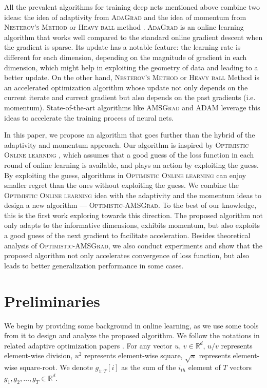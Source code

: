 \documentclass[11pt]{article}
\theoremstyle{k}
\begin{document}
All the prevalent algorithms for training deep nets mentioned above combine two ideas: the idea of adaptivity from \textsc{AdaGrad} \cite{DHS11,MS10} and the idea of momentum from \textsc{Nesterov's  Method} \cite{N04} or \textsc{Heavy ball} method \cite{P64}.
\textsc{AdaGrad} is an online learning algorithm that works well compared to the standard online gradient descent when the gradient is sparse.
Its update has a notable feature: the learning rate is different for each dimension, depending on the magnitude of gradient in each dimension, which might help in exploiting the geometry of data and leading to a better update. 
On the other hand,
\textsc{Nesterov's Method} or \textsc{Heavy ball} Method \cite{P64} is an accelerated optimization algorithm whose update not only depends on the current iterate and current gradient but also depends on the past gradients (i.e. momentum). State-of-the-art algorithms like \textsc{AMSGrad} \cite{RKK18} and \textsc{ADAM} \cite{KB15} leverage this ideas to accelerate the training process of neural nets.

In this paper, we propose an algorithm that goes further than the hybrid of the adaptivity and momentum approach. Our algorithm is inspired by \textsc{Optimistic Online learning} \cite{CJ12,RS13,SALS15,ALLW18}, which assumes that a good guess of the loss function in each round of online learning is available, and plays an action by exploiting the guess. 
By exploiting the guess, algorithms in 
\textsc{Optimistic Online learning}
can enjoy smaller regret than the ones without exploiting the guess.
We combine the \textsc{Optimistic Online learning} idea with the adaptivity and the momentum ideas to design a new algorithm --- \textsc{Optimistic-AMSGrad}. To the best of our knowledge, this is the first work exploring towards this direction. The proposed algorithm
not only adapts to the informative dimensions, exhibits momentum, but also exploits a good guess of the next gradient to facilitate acceleration. Besides theoretical analysis of \textsc{Optimistic-AMSGrad}, we also conduct experiments and show that the proposed algorithm not only accelerates convergence of loss function, but also leads to better generalization performance in some cases.

\section{Preliminaries}
We begin by providing some background in online learning, as we use some tools from it to 
design and analyze the proposed algorithm.
We follow the notations in related adaptive optimization papers \cite{KB15,RKK18}. For any vector $u$, $v \in \mathbb R^{d}$,  $u/v$ represents element-wise division,
$u^{2}$ represents element-wise square, $\sqrt{u}$ represents element-wise square-root.
We denote $g_{1:T}[i]$ as the sum of the $i_{th}$ element of $T$ vectors $g_{1}, g_{2},
\dots, g_{T} \in \mathbb R^{d}$.
\end{document}
